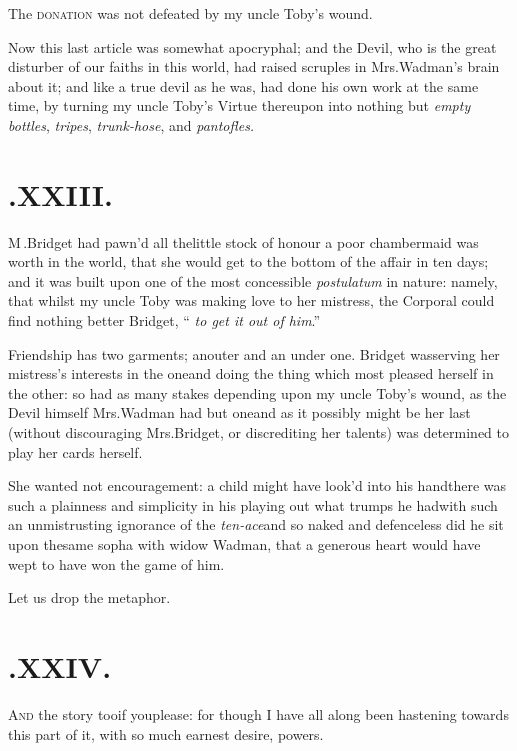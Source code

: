 \documentclass{article}
\begin{document}
The \textsc{donation} was not defeated by my uncle
Toby’s wound.

\newpage
Now this last article was somewhat apocryphal; and the Devil,
who is the great disturber of our faiths in this world, had raised
scruples in Mrs.\@ Wadman’s brain about it; and like a
true devil as he was, had done his own work at the same time, by
turning my uncle Toby’s Virtue thereupon into nothing
but \textit{empty bottles}, \textit{tripes}, \textit{trunk-hose}, and
\textit{pantofles.}

\newpage
\section{.\enspace XXIII.}

\lettrine{M}{\,}.\@ Bridget had pawn’d
all the\break little stock of honour a poor chambermaid was worth in the
world, that she would get to the bottom of the affair in ten days;
and it was built upon one of the most concessible \textit{postulatum}
in nature: namely, that whilst my uncle Toby was making love
to her mistress, the Corporal could find nothing better\break 
{}
Bridget, “ \textit{to get it out of him}.”

Friendship has two garments; an\break outer and an under one.
Bridget was\pb serving her mistress’s interests in the
one\tsk and doing the thing which most pleased herself in the
other: so had as many stakes depending upon my uncle
Toby’s wound, as the Devil himself\tsh 
Mrs.\@ Wadman had but one\tsk and as it possibly might be her
last (without discouraging Mrs.\@ Bridget, or discrediting her
talents) was determined to play her cards herself.

She wanted not encouragement: a child might have look’d
into his hand\break\tsh there was such a plainness and
simplicity in his playing out what trumps he had\tsh with
such an unmistrusting ignorance of the
\textit{ten-ace}\tsh and so naked and defenceless did he sit
upon the\pb same sopha with widow Wadman, that a generous heart
would have wept to have won the game of him.

Let us drop the metaphor.

\newpage
\section{.\enspace XXIV.}

\lettrine{\Tsk A}{nd} the story too\tsk if you\break please: for though I have all
along been hastening towards this part of it, with so much earnest desire,
powers.
\end{document}
